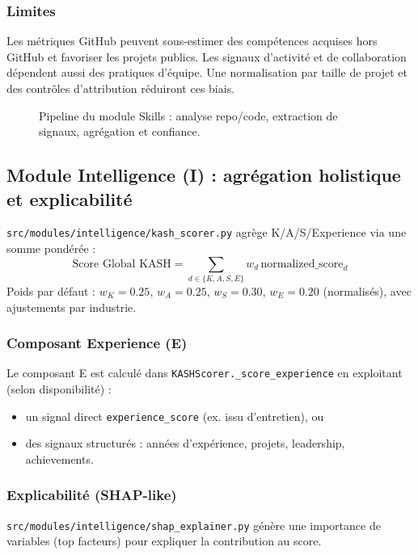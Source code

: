\documentclass[11pt,a4paper]{article}
\begin{document}
\subsubsection*{Limites}
Les m\'etriques GitHub peuvent sous-estimer des comp\'etences acquises hors GitHub et favoriser les projets publics. Les signaux d'activit\'e et de collaboration d\'ependent aussi des pratiques d'\'equipe. Une normalisation par taille de projet et des contr\^oles d'attribution r\'eduiront ces biais.

\begin{figure}[H]
    \centering
    
    \caption{Pipeline du module Skills : analyse repo/code, extraction de signaux, agr\'egation et confiance.}
    \label{fig:skills_pipeline}
\end{figure}

\subsection{Module Intelligence (I) : agr\'egation holistique et explicabilit\'e}
\texttt{src/modules/intelligence/kash\_scorer.py} agr\`ege K/A/S/Experience via une somme pond\'er\'ee :
\begin{equation}
\text{Score Global KASH} = \sum_{d \in \{K,A,S,E\}} w_d\, \text{normalized\_score}_d
\end{equation}
Poids par d\'efaut : $w_K = 0.25$, $w_A = 0.25$, $w_S = 0.30$, $w_E = 0.20$ (normalis\'es), avec ajustements par industrie.

\subsubsection*{Composant Experience (E)}
Le composant E est calcul\'e dans \texttt{KASHScorer.\_score\_experience} en exploitant (selon disponibilit\'e) :
\begin{itemize}
    \item un signal direct \texttt{experience\_score} (ex. issu d'entretien), ou
    \item des signaux structur\'es : ann\'ees d'exp\'erience, projets, leadership, achievements.
\end{itemize}

\subsubsection*{Explicabilit\'e (SHAP-like)}
\texttt{src/modules/intelligence/shap\_explainer.py} g\'en\`ere une importance de variables (top facteurs) pour expliquer la contribution au score.
\end{document}
